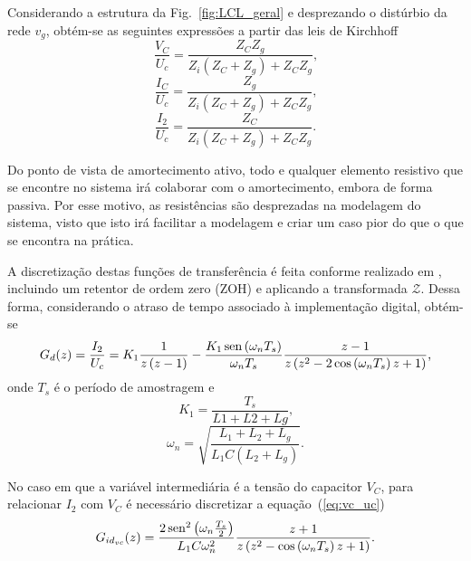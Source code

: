     Considerando a estrutura da Fig.~\ref{fig:LCL_geral} e desprezando o distúrbio da rede $v_g$, obtém-se as seguintes expressões a partir das leis de Kirchhoff
    \begin{equation}
        \frac{V_C}{U_c} = \frac{Z_C Z_g}{Z_i \left( Z_C + Z_g \right) + Z_C Z_g}
        \text{,}
        \label{eq:vc_uc}
    \end{equation}
    \begin{equation}
        \frac{I_C}{U_c} = \frac{Z_g}{Z_i \left( Z_C + Z_g \right) + Z_C Z_g}
        \text{,}
        \label{eq:ic_uc}
    \end{equation}
    \begin{equation}
        \frac{I_2}{U_c} = \frac{Z_C}{Z_i \left( Z_C + Z_g \right) + Z_C Z_g}
        \text{.}
    \end{equation}

    Do ponto de vista de amortecimento ativo, todo e qualquer elemento resistivo que se encontre no sistema irá colaborar com o amortecimento, embora de forma passiva. Por esse motivo, as resistências são desprezadas na modelagem do sistema, visto que isto irá facilitar a modelagem e criar um caso pior do que o que se encontra na prática.

    A discretização destas funções de transferência é feita conforme realizado em \cite{ref:PARKER}, incluindo um retentor de ordem zero (ZOH) e aplicando a transformada $\mathcal{Z}$. Dessa forma, considerando o atraso de tempo associado à implementação digital, obtém-se
    \begin{equation}
        G_d (z) = \frac{I_2}{U_c} = K_1 \frac{1}{z \left( z-1 \right)}
        - \frac{K_1 \operatorname{sen} \left( \omega_n T_s \right) }{\omega_n T_s}
        \frac{z-1}{z \left( z^2 - 2 \cos\left( \omega_n T_s \right) z +1 \right) }
        \text{,}
    \end{equation}
    onde $T_s$ é o período de amostragem e
    \begin{equation}
        K_1 = \frac{T_s}{L1 + L2 + Lg} \text{,}
    \end{equation}
    \begin{equation}
        \omega_n = \sqrt{\frac{ L_1 + L_2 + L_g }{ L_1 C \left( L_2 + L_g \right)}}
        \text{.}
    \end{equation}

    No caso em que a variável intermediária é a tensão do capacitor $V_C$, para relacionar $I_2$ com $V_C$ é necessário discretizar a equação~(\ref{eq:vc_uc})
    \begin{equation}
        G_{id_{vc}}(z) = \frac{2 \operatorname{sen}^2 \left( \omega_n \frac{T_s}{2} \right)}{L_1 C \omega_n^2}
            \frac{z+1}{z \left( z^2 - \cos \left( \omega_n T_s \right) z + 1 \right)}
            \text{.}
    \end{equation}

